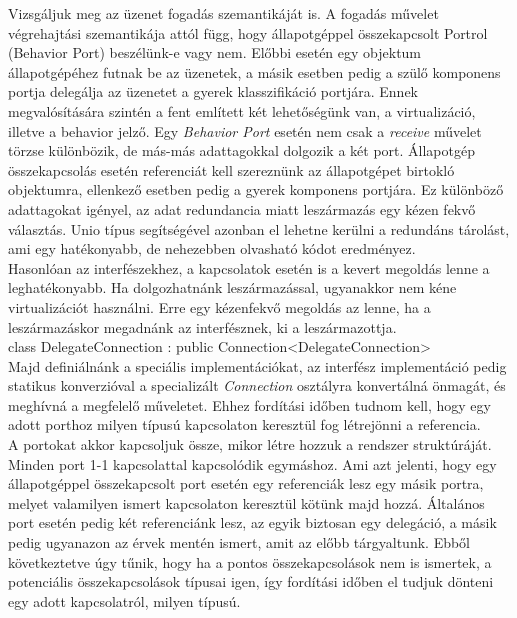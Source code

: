 \documentclass[a4paper,12pt]{report}
\begin{document}
Vizsgáljuk meg az üzenet fogadás szemantikáját is. A fogadás művelet végrehajtási szemantikája attól függ, hogy állapotgéppel összekapcsolt Portrol (Behavior Port) beszélünk-e vagy nem. Előbbi esetén egy objektum állapotgépéhez futnak be az üzenetek, a másik esetben pedig a szülő komponens portja delegálja az üzenetet a gyerek klasszifikáció portjára. Ennek megvalósítására szintén a fent említett két lehetőségünk van, a virtualizáció, illetve a behavior jelző. Egy \textit{Behavior Port} esetén nem csak a \textit{receive} művelet törzse különbözik, de más-más adattagokkal dolgozik a két port. Állapotgép összekapcsolás esetén referenciát kell szereznünk az állapotgépet birtokló objektumra, ellenkező esetben pedig a gyerek komponens portjára. Ez különböző adattagokat igényel, az adat redundancia miatt leszármazás egy kézen fekvő választás. Unio típus segítségével azonban el lehetne kerülni a redundáns tárolást, ami egy hatékonyabb, de nehezebben olvasható kódot eredményez.
\\

Hasonlóan az interfészekhez, a kapcsolatok esetén is a kevert megoldás lenne a leghatékonyabb. Ha dolgozhatnánk leszármazással, ugyanakkor nem kéne virtualizációt használni. Erre egy kézenfekvő megoldás az lenne, ha a leszármazáskor megadnánk az interfésznek, ki a leszármazottja. \\
class DelegateConnection : public Connection<DelegateConnection> \\
Majd definiálnánk a speciális implementációkat, az interfész implementáció pedig statikus konverzióval a specializált \textit{Connection} osztályra konvertálná önmagát, és meghívná a megfelelő műveletet. Ehhez fordítási időben tudnom kell, hogy egy adott porthoz milyen típusú kapcsolaton keresztül fog létrejönni a referencia. \\ 
A portokat akkor kapcsoljuk össze, mikor létre hozzuk a rendszer struktúráját. Minden port 1-1 kapcsolattal kapcsolódik egymáshoz. Ami azt jelenti, hogy egy állapotgéppel összekapcsolt port esetén egy referenciák lesz egy másik portra, melyet valamilyen ismert kapcsolaton keresztül kötünk majd hozzá. Általános port esetén pedig két referenciánk lesz, az egyik biztosan egy delegáció, a másik pedig ugyanazon az érvek mentén ismert, amit az előbb tárgyaltunk. Ebből következtetve úgy tűnik, hogy ha a pontos összekapcsolások nem is ismertek, a potenciális összekapcsolások típusai igen, így fordítási időben el tudjuk dönteni egy adott kapcsolatról, milyen típusú.
\end{document}
